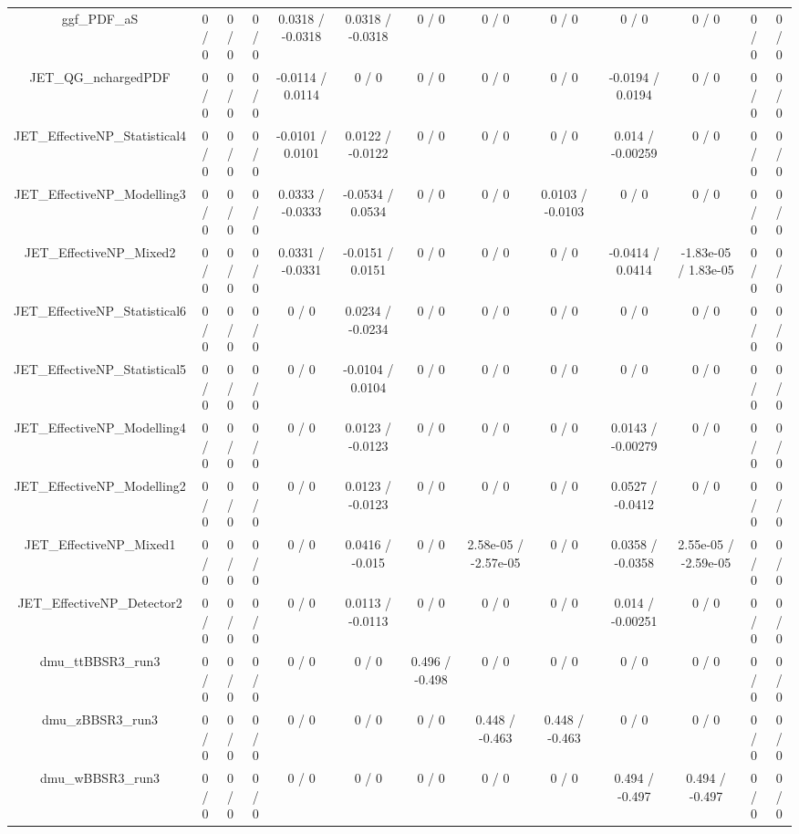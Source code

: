 \documentclass[10pt]{article}
\begin{document}
\begin{table}[htbp]
\begin{center}
\begin{tabular}{|c|c|c|c|c|c|c|c|c|c|c|c|c|}
  ggf_PDF_aS & 0 / 0 & 0 / 0 & 0 / 0 & 0.0318 / -0.0318 & 0.0318 / -0.0318 & 0 / 0 & 0 / 0 & 0 / 0 & 0 / 0 & 0 / 0 & 0 / 0 & 0 / 0 \\ 
  JET_QG_nchargedPDF & 0 / 0 & 0 / 0 & 0 / 0 & -0.0114 / 0.0114 & 0 / 0 & 0 / 0 & 0 / 0 & 0 / 0 & -0.0194 / 0.0194 & 0 / 0 & 0 / 0 & 0 / 0 \\ 
  JET_EffectiveNP_Statistical4 & 0 / 0 & 0 / 0 & 0 / 0 & -0.0101 / 0.0101 & 0.0122 / -0.0122 & 0 / 0 & 0 / 0 & 0 / 0 & 0.014 / -0.00259 & 0 / 0 & 0 / 0 & 0 / 0 \\ 
  JET_EffectiveNP_Modelling3 & 0 / 0 & 0 / 0 & 0 / 0 & 0.0333 / -0.0333 & -0.0534 / 0.0534 & 0 / 0 & 0 / 0 & 0.0103 / -0.0103 & 0 / 0 & 0 / 0 & 0 / 0 & 0 / 0 \\ 
  JET_EffectiveNP_Mixed2 & 0 / 0 & 0 / 0 & 0 / 0 & 0.0331 / -0.0331 & -0.0151 / 0.0151 & 0 / 0 & 0 / 0 & 0 / 0 & -0.0414 / 0.0414 & -1.83e-05 / 1.83e-05 & 0 / 0 & 0 / 0 \\ 
  JET_EffectiveNP_Statistical6 & 0 / 0 & 0 / 0 & 0 / 0 & 0 / 0 & 0.0234 / -0.0234 & 0 / 0 & 0 / 0 & 0 / 0 & 0 / 0 & 0 / 0 & 0 / 0 & 0 / 0 \\ 
  JET_EffectiveNP_Statistical5 & 0 / 0 & 0 / 0 & 0 / 0 & 0 / 0 & -0.0104 / 0.0104 & 0 / 0 & 0 / 0 & 0 / 0 & 0 / 0 & 0 / 0 & 0 / 0 & 0 / 0 \\ 
  JET_EffectiveNP_Modelling4 & 0 / 0 & 0 / 0 & 0 / 0 & 0 / 0 & 0.0123 / -0.0123 & 0 / 0 & 0 / 0 & 0 / 0 & 0.0143 / -0.00279 & 0 / 0 & 0 / 0 & 0 / 0 \\ 
  JET_EffectiveNP_Modelling2 & 0 / 0 & 0 / 0 & 0 / 0 & 0 / 0 & 0.0123 / -0.0123 & 0 / 0 & 0 / 0 & 0 / 0 & 0.0527 / -0.0412 & 0 / 0 & 0 / 0 & 0 / 0 \\ 
  JET_EffectiveNP_Mixed1 & 0 / 0 & 0 / 0 & 0 / 0 & 0 / 0 & 0.0416 / -0.015 & 0 / 0 & 2.58e-05 / -2.57e-05 & 0 / 0 & 0.0358 / -0.0358 & 2.55e-05 / -2.59e-05 & 0 / 0 & 0 / 0 \\ 
  JET_EffectiveNP_Detector2 & 0 / 0 & 0 / 0 & 0 / 0 & 0 / 0 & 0.0113 / -0.0113 & 0 / 0 & 0 / 0 & 0 / 0 & 0.014 / -0.00251 & 0 / 0 & 0 / 0 & 0 / 0 \\ 
  dmu_ttBBSR3_run3 & 0 / 0 & 0 / 0 & 0 / 0 & 0 / 0 & 0 / 0 & 0.496 / -0.498 & 0 / 0 & 0 / 0 & 0 / 0 & 0 / 0 & 0 / 0 & 0 / 0 \\ 
  dmu_zBBSR3_run3 & 0 / 0 & 0 / 0 & 0 / 0 & 0 / 0 & 0 / 0 & 0 / 0 & 0.448 / -0.463 & 0.448 / -0.463 & 0 / 0 & 0 / 0 & 0 / 0 & 0 / 0 \\ 
  dmu_wBBSR3_run3 & 0 / 0 & 0 / 0 & 0 / 0 & 0 / 0 & 0 / 0 & 0 / 0 & 0 / 0 & 0 / 0 & 0.494 / -0.497 & 0.494 / -0.497 & 0 / 0 & 0 / 0 \\ 

\end{tabular}
\end{center}
\end{table}
\end{document}

